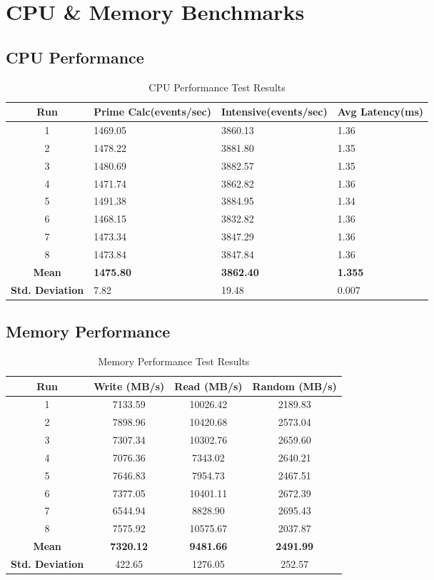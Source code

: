 \section{CPU \& Memory Benchmarks}

\subsection{CPU Performance}
\begin{table}[H]
\centering
\begin{tabular}{|c|p{3cm}|p{3cm}|p{3cm}|}
\hline
\textbf{Run} & \textbf{Prime Calc\newline(events/sec)} & \textbf{Intensive\newline(events/sec)} & \textbf{Avg Latency\newline(ms)} \\
\hline
1 & 1469.05 & 3860.13 & 1.36 \\
2 & 1478.22 & 3881.80 & 1.35 \\
3 & 1480.69 & 3882.57 & 1.35 \\
4 & 1471.74 & 3862.82 & 1.36 \\
5 & 1491.38 & 3884.95 & 1.34 \\
6 & 1468.15 & 3832.82 & 1.36 \\
7 & 1473.34 & 3847.29 & 1.36 \\
8 & 1473.84 & 3847.84 & 1.36 \\
\hline
\textbf{Mean} & \textbf{1475.80} & \textbf{3862.40} & \textbf{1.355} \\
\textbf{Std. Deviation} & 7.82 & 19.48 & 0.007 \\
\hline
\end{tabular}
\caption{CPU Performance Test Results}
\end{table}

\subsection{Memory Performance}
\begin{table}[H]
\centering
\begin{tabular}{|c|c|c|c|}
\hline
\textbf{Run} & \textbf{Write (MB/s)} & \textbf{Read (MB/s)} & \textbf{Random (MB/s)} \\
\hline
1 & 7133.59 & 10026.42 & 2189.83 \\
2 & 7898.96 & 10420.68 & 2573.04 \\
3 & 7307.34 & 10302.76 & 2659.60 \\
4 & 7076.36 & 7343.02 & 2640.21 \\
5 & 7646.83 & 7954.73 & 2467.51 \\
6 & 7377.05 & 10401.11 & 2672.39 \\
7 & 6544.94 & 8828.90 & 2695.43 \\
8 & 7575.92 & 10575.67 & 2037.87 \\
\hline
\textbf{Mean} & \textbf{7320.12} & \textbf{9481.66} & \textbf{2491.99} \\
\textbf{Std. Deviation} & 422.65 & 1276.05 & 252.57 \\
\hline
\end{tabular}
\caption{Memory Performance Test Results}
\end{table}

